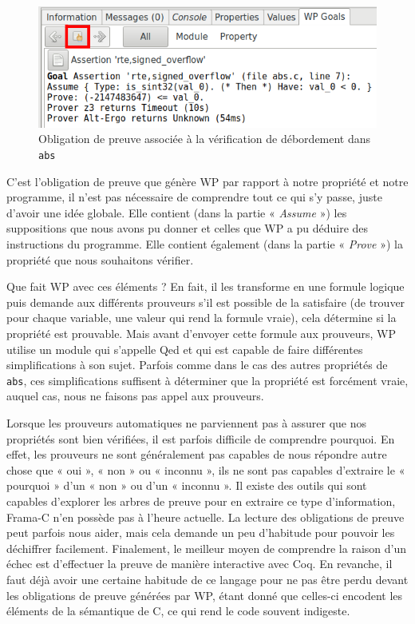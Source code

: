 \documentclass[12pt,francais,]{scrbook}
\begin{document}
\begin{figure}[htbp]
\centering
\includegraphics[scale=0.5]{2-1-1-abs-6.png}
\caption{Obligation de preuve associée à la vérification de débordement
dans \texttt{abs}}
\label{fig:2-1-1-abs-6}
\end{figure}


C'est l'obligation de preuve que génère WP par rapport à notre propriété
et notre programme, il n'est pas nécessaire de comprendre tout ce qui
s'y passe, juste d'avoir une idée globale. Elle contient (dans la partie
« \emph{Assume} ») les suppositions que nous avons pu donner et celles
que WP a pu déduire des instructions du programme. Elle contient
également (dans la partie « \emph{Prove} ») la propriété que nous
souhaitons vérifier.

Que fait WP avec ces éléments ? En fait, il les transforme en une
formule logique puis demande aux différents prouveurs s'il est possible
de la satisfaire (de trouver pour chaque variable, une valeur qui rend
la formule vraie), cela détermine si la propriété est prouvable. Mais
avant d'envoyer cette formule aux prouveurs, WP utilise un module qui
s'appelle Qed et qui est capable de faire différentes simplifications à
son sujet. Parfois comme dans le cas des autres propriétés de
\texttt{abs}, ces simplifications suffisent à déterminer que la
propriété est forcément vraie, auquel cas, nous ne faisons pas appel aux
prouveurs.

Lorsque les prouveurs automatiques ne parviennent pas à assurer que nos
propriétés sont bien vérifiées, il est parfois difficile de comprendre
pourquoi. En effet, les prouveurs ne sont généralement pas capables de
nous répondre autre chose que « oui », « non » ou « inconnu », ils ne
sont pas capables d'extraire le « pourquoi » d'un « non » ou d'un «
inconnu ». Il existe des outils qui sont capables d'explorer les arbres
de preuve pour en extraire ce type d'information, Frama-C n'en possède
pas à l'heure actuelle. La lecture des obligations de preuve peut
parfois nous aider, mais cela demande un peu d'habitude pour pouvoir les
déchiffrer facilement. Finalement, le meilleur moyen de comprendre la
raison d'un échec est d'effectuer la preuve de manière interactive avec
Coq. En revanche, il faut déjà avoir une certaine habitude de ce langage
pour ne pas être perdu devant les obligations de preuve générées par WP,
étant donné que celles-ci encodent les éléments de la sémantique de C,
ce qui rend le code souvent indigeste.
\end{document}
